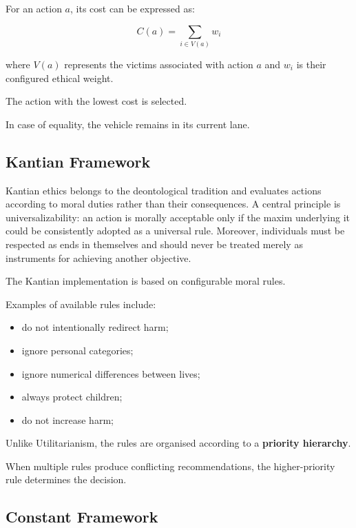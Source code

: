 \documentclass[10pt,a4paper]{article}
\begin{document}
For an action $a$, its cost can be expressed as:

\begin{equation}
C(a) = \sum_{i \in V(a)} w_i
\end{equation}

where $V(a)$ represents the victims associated with action $a$ and
$w_i$ is their configured ethical weight.

The action with the lowest cost is selected.

In case of equality, the vehicle remains in its current lane.


\subsection{Kantian Framework}

Kantian ethics belongs to the deontological tradition and evaluates
actions according to moral duties rather than their consequences.
A central principle is universalizability: an action is morally acceptable
only if the maxim underlying it could be consistently adopted as a
universal rule. Moreover, individuals must be respected as ends in
themselves and should never be treated merely as instruments for
achieving another objective.

The Kantian implementation is based on configurable moral rules.

Examples of available rules include:

\begin{itemize}
    \item do not intentionally redirect harm;
    \item ignore personal categories;
    \item ignore numerical differences between lives;
    \item always protect children;
    \item do not increase harm;
\end{itemize}

Unlike Utilitarianism, the rules are organised according to a
\textbf{priority hierarchy}.

When multiple rules produce conflicting recommendations, the
higher-priority rule determines the decision.


\subsection{Constant Framework}
\end{document}
